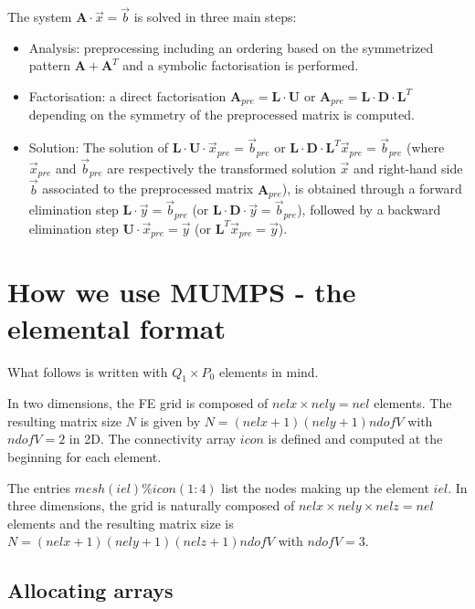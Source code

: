 The system ${\bm A}\cdot{\vec x} = {\vec b}$ is solved in three main steps:
\begin{itemize}
\item Analysis: preprocessing including an 
ordering based on the symmetrized pattern ${\bm A} + {\bm A}^T$ 
and a symbolic factorisation is performed. 

\item Factorisation: a direct factorisation ${\bm A}_{pre} = {\bm L}\cdot{\bm U}$ 
or ${\bm A}_{pre} = {\bm L}\cdot{\bm D}\cdot {\bm L}^T$ depending on 
the symmetry of the preprocessed matrix is computed. 

\item Solution:
The solution of ${\bm L}\cdot{\bm U}\cdot{\vec x}_{pre} = {\vec b}_{pre}$ 
or ${\bm L}\cdot{\bm D}\cdot{\bm L}^T {\vec x}_{pre} = {\vec b}_{pre}$ (where 
${\vec x}_{pre}$ and ${\vec b}_{pre}$ are respectively the transformed solution 
${\vec x}$ and right-hand side ${\vec b}$ associated to the preprocessed matrix 
${\bm A}_{pre}$), is obtained through a forward elimination step
${\bm L}\cdot{\vec y}={\vec b}_{pre}$ (or ${\bm L}\cdot{\bm D}\cdot{\vec y}={\vec b}_{pre}$), 
followed by a backward elimination step
${\bm U}\cdot{\vec x}_{pre} ={\vec y}$ (or ${\bm L}^T{\vec x}_{pre} ={\vec y}$). 

\end{itemize}



\section{How we use MUMPS - the elemental format}

What follows is written with $Q_1\times P_0$ elements in mind. 

In two dimensions, the FE grid is composed of $nelx \times nely=nel$ elements. 
The resulting matrix size $N$ is given by $N=(nelx+1)(nely+1)ndofV$ with $ndofV=2$ in 2D.
The connectivity array $icon$ is defined and computed at the beginning for each element. 

The entries $mesh(iel)\%icon(1:4)$ list the nodes making up the element $iel$.
In three dimensions, the grid is naturally composed of 
$nelx \times nely \times nelz = nel$ elements and the 
resulting matrix size is $N=(nelx+1)(nely+1)(nelz+1)ndofV$ with $ndofV=3$.

\subsection{Allocating arrays}

